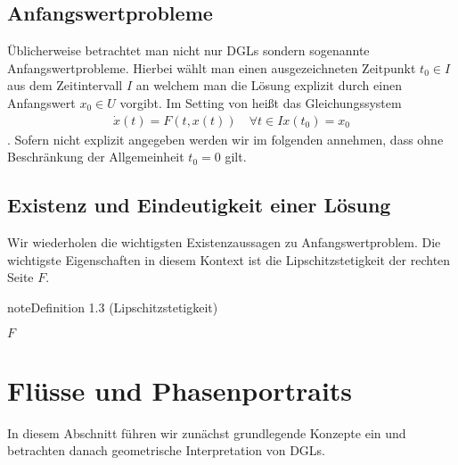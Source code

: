 \documentclass[letterpaper,10pt,english]{jupyterBook}
\begin{document}
\subsection{Anfangswertprobleme}
\label{\detokenize{ode/repetition:anfangswertprobleme}}
Üblicherweise betrachtet man nicht nur DGLs sondern sogenannte Anfangswertprobleme. Hierbei wählt man einen ausgezeichneten Zeitpunkt \(t_0\in I\) aus dem Zeitintervall \(I\) an welchem man die Lösung explizit durch einen Anfangswert \(x_0\in U\) vorgibt. Im Setting von {\hyperref[\detokenize{ode/repetition:def:DGL}]{}} heißt
das Gleichungssystem
\begin{equation}\label{equation:ode/repetition:eq:AWP}
\begin{split}\dot{x}(t) = F(t, x(t))\quad\forall t\in I
x(t_0) = x_0\end{split}
\end{equation}
. Sofern nicht explizit angegeben werden wir im folgenden annehmen, dass ohne Beschränkung der Allgemeinheit \(t_0=0\) gilt.


\subsection{Existenz und Eindeutigkeit einer Lösung}
\label{\detokenize{ode/repetition:existenz-und-eindeutigkeit-einer-losung}}
Wir wiederholen die wichtigsten Existenzaussagen zu Anfangswertproblem. Die wichtigste Eigenschaften in diesem Kontext ist die Lipschitzstetigkeit der rechten Seite \(F\).
\label{ode/repetition:definition-3}
\begin{sphinxadmonition}{note}{Definition 1.3 (Lipschitzstetigkeit)}



\(F\)
\end{sphinxadmonition}


\section{Flüsse und Phasenportraits}
\label{\detokenize{ode/fluesse:flusse-und-phasenportraits}}\label{\detokenize{ode/fluesse:s-fluesse}}\label{\detokenize{ode/fluesse::doc}}
In diesem Abschnitt führen wir zunächst grundlegende Konzepte ein und betrachten danach geometrische Interpretation von DGLs.
\end{document}
